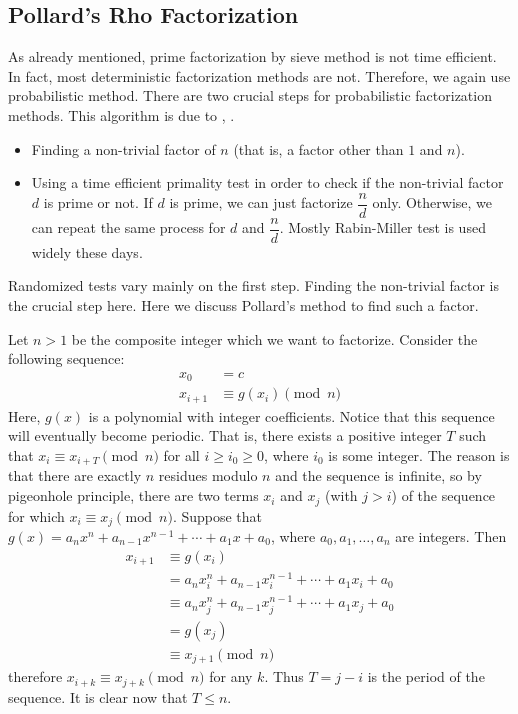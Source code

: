 \documentclass{subfiles}
\begin{document}
\subsection{Pollard's Rho Factorization}
	As already mentioned, prime factorization by sieve method is not time efficient. In fact, most deterministic factorization methods are not. Therefore, we again use probabilistic method. There are two crucial steps for probabilistic factorization methods. This algorithm is due to \textcite{pollard_1975}, \textcite{brent_1980}.
		\begin{itemize}
			\item Finding a non-trivial factor of $n$ (that is, a factor other than $1$ and $n$).
			\item Using a time efficient primality test in order to check if the non-trivial factor $d$ is prime or not. If $d$ is prime, we can just factorize $\dfrac{n}{d}$ only. Otherwise, we can repeat the same process for $d$ and $\dfrac{n}{d}$. Mostly Rabin-Miller test is used widely these days.
		\end{itemize}
	Randomized tests vary mainly on the first step. Finding the non-trivial factor is the crucial step here. Here we discuss Pollard's method to find such a factor.

	Let $n>1$ be the composite integer which we want to factorize. Consider the following sequence:
		\begin{align*}
			x_0 &= c\\
			x_{i+1} &\equiv g(x_i) \pmod n
		\end{align*}
	Here, $g(x)$ is a polynomial with integer coefficients. Notice that this sequence will eventually become periodic. That is, there exists a positive integer $T$ such that $x_i \equiv x_{i+T} \pmod n$ for all $i\geq i_0\geq 0$, where $i_0$ is some integer. The reason is that there are exactly $n$ residues modulo $n$ and the sequence is infinite, so by pigeonhole principle, there are two terms $x_i$ and $x_j$ (with $j>i$) of the sequence for which $x_i \equiv x_j \pmod n$. Suppose that $g(x)=a_nx^n+a_{n-1}x^{n-1} + \cdots + a_1x+a_0$, where $a_0, a_1, \ldots, a_n$ are integers. Then
		\begin{align*}
			x_{i+1} &\equiv g(x_i) \\
					&= a_nx_i^n+a_{n-1}x_i^{n-1} + \cdots + a_1x_i+a_0 \\
	 			    &\equiv a_nx_j^n+a_{n-1}x_j^{n-1} + \cdots + a_1x_j+a_0\\
					&= g(x_j) \\
					&\equiv x_{j+1} \pmod n
		\end{align*}
	therefore $x_{i+k} \equiv x_{j+k} \pmod n $ for any $k$. Thus $T=j-i$ is the period of the sequence. It is clear now that $T \leq n$.
\end{document}
